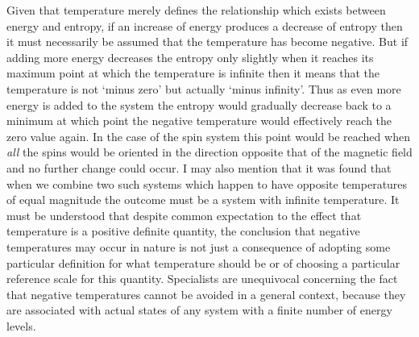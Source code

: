 \documentclass[notitlepage,12pt]{report}
\begin{document}
Given that temperature merely defines the relationship which exists between energy and entropy, if an increase of energy produces a decrease of entropy then it must necessarily be assumed that the temperature has become negative. But if adding more energy decreases the entropy only slightly when it reaches its maximum point at which the temperature is infinite then it means that the temperature is not `minus zero' but actually `minus infinity'. Thus as even more energy is added to the system the entropy would gradually decrease back to a minimum at which point the negative temperature would effectively reach the zero value again. In the case of the spin system this point would be reached when \textit{all} the spins would be oriented in the direction opposite that of the magnetic field and no further change could occur. I may also mention that it was found that when we combine two such systems which happen to have opposite temperatures of equal magnitude the outcome must be a system with infinite temperature. It must be understood that despite common expectation to the effect that temperature is a positive definite quantity, the conclusion that negative temperatures may occur in nature is not just a consequence of adopting some particular definition for what temperature should be or of choosing a particular reference scale for this quantity. Specialists are unequivocal concerning the fact that negative temperatures cannot be avoided in a general context, because they are associated with actual states of any system with a finite number of energy levels.
\end{document}
